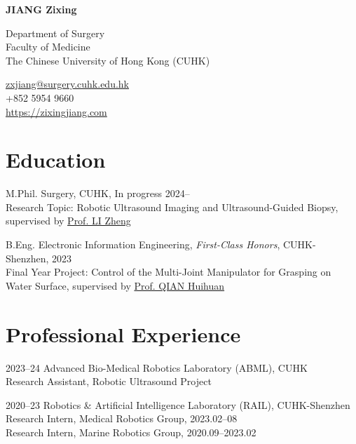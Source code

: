 \documentclass[11pt,letterpaper]{report}
\newcommand{\myname}{JIANG Zixing}
\newcommand{\namefont}[1]{{\normalfont\bfseries\Huge{#1}}}
\begin{document}
	\thispagestyle{firstpagefooter}
	\raggedright{}
	
\namefont{\myname}
	
\vspace{1em}
\begin{minipage}[t]{0.700\textwidth}
	Department of Surgery\\ 
	Faculty of Medicine\\
	The Chinese University of Hong Kong (CUHK)
\end{minipage}
\hfil
\begin{minipage}[t]{0.295\textwidth}
	\flushright{}
	\href{mailto:zxjiang@surgery.cuhk.edu.hk}{zxjiang@surgery.cuhk.edu.hk} \\
	+852 5954 9660 \\
	\href{https://zixingjiang.com}{https://zixingjiang.com}\\
\end{minipage}
	
	\section*{Education}
\begin{tablist}
	\item[M.Phil.]  \tab{}Surgery, CUHK, In progress 2024-- \\
	Research Topic: Robotic Ultrasound Imaging and Ultrasound-Guided Biopsy, supervised by \href{https://www.surgery.cuhk.edu.hk/profile.asp?alias=zli}{Prof. LI Zheng}
	\item[B.Eng.]  \tab{}Electronic Information Engineering, \textit{First-Class Honors}, CUHK-Shenzhen, 2023\\
	Final Year Project: Control of the Multi-Joint Manipulator for Grasping on Water Surface, supervised by \href{https://sse.cuhk.edu.cn/en/faculty/qianhuihuan}{Prof. QIAN Huihuan}
\end{tablist}



\section*{Professional Experience}
\begin{tablist}
	\item[2023--24]   \tab{}Advanced Bio-Medical Robotics Laboratory (ABML), CUHK \\
	Research Assistant, Robotic Ultrasound Project
	
	\item[2020--23]   \tab{}Robotics \& Artificial Intelligence Laboratory (RAIL), CUHK-Shenzhen \\
	Research Intern, Medical Robotics Group, 2023.02--08\\
	Research Intern, Marine Robotics Group, 2020.09--2023.02
\end{tablist}
\end{document}
